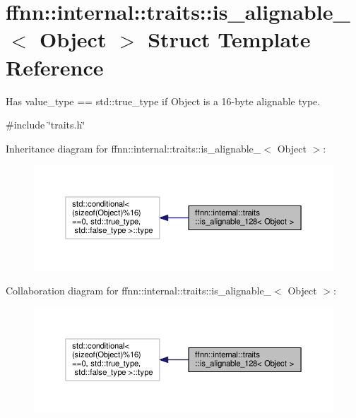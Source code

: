 \hypertarget{structffnn_1_1internal_1_1traits_1_1is__alignable__128}{\section{ffnn\-:\-:internal\-:\-:traits\-:\-:is\-\_\-alignable\-\_$<$ Object $>$ Struct Template Reference}
\label{structffnn_1_1internal_1_1traits_1_1is__alignable__128}
}


Has {\ttfamily value\-\_\-type == std\-::true\-\_\-type} if {\ttfamily Object} is a 16-\/byte alignable type.  




{\ttfamily \#include \char`\"{}traits.\-h\char`\"{}}



Inheritance diagram for ffnn\-:\-:internal\-:\-:traits\-:\-:is\-\_\-alignable\-\_$<$ Object $>$\-:\nopagebreak
\begin{figure}[H]
\begin{center}
\leavevmode
\includegraphics[width=350pt]{structffnn_1_1internal_1_1traits_1_1is__alignable__128__inherit__graph}
\end{center}
\end{figure}


Collaboration diagram for ffnn\-:\-:internal\-:\-:traits\-:\-:is\-\_\-alignable\-\_$<$ Object $>$\-:\nopagebreak
\begin{figure}[H]
\begin{center}
\leavevmode
\includegraphics[width=350pt]{structffnn_1_1internal_1_1traits_1_1is__alignable__128__coll__graph}
\end{center}
\end{figure}


